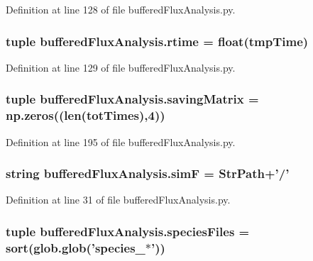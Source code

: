 Definition at line 128 of file buffered\-Flux\-Analysis.\-py.

\hypertarget{namespacebuffered_flux_analysis_a3a242047ff630fce5bc0c36591a9b22b}{
\subsubsection[{rtime}]{\setlength{\rightskip}{0pt plus 5cm}tuple buffered\-Flux\-Analysis.\-rtime = float(tmp\-Time)}}\label{namespacebuffered_flux_analysis_a3a242047ff630fce5bc0c36591a9b22b}


Definition at line 129 of file buffered\-Flux\-Analysis.\-py.

\hypertarget{namespacebuffered_flux_analysis_a20f8e8350b77ca9121474e7177166800}{
\subsubsection[{saving\-Matrix}]{\setlength{\rightskip}{0pt plus 5cm}tuple buffered\-Flux\-Analysis.\-saving\-Matrix = np.\-zeros((len({\bf tot\-Times}),4))}}\label{namespacebuffered_flux_analysis_a20f8e8350b77ca9121474e7177166800}


Definition at line 195 of file buffered\-Flux\-Analysis.\-py.

\hypertarget{namespacebuffered_flux_analysis_a94f9529239340003572ace8de46bee35}{
\subsubsection[{sim\-F}]{\setlength{\rightskip}{0pt plus 5cm}string buffered\-Flux\-Analysis.\-sim\-F = {\bf Str\-Path}+'/'}}\label{namespacebuffered_flux_analysis_a94f9529239340003572ace8de46bee35}


Definition at line 31 of file buffered\-Flux\-Analysis.\-py.

\hypertarget{namespacebuffered_flux_analysis_a898dbb3abbe3e409d2ee83d4a5362d6b}{
\subsubsection[{species\-Files}]{\setlength{\rightskip}{0pt plus 5cm}tuple buffered\-Flux\-Analysis.\-species\-Files = sort(glob.\-glob('species\-\_\-$\ast$'))}}\label{namespacebuffered_flux_analysis_a898dbb3abbe3e409d2ee83d4a5362d6b}


